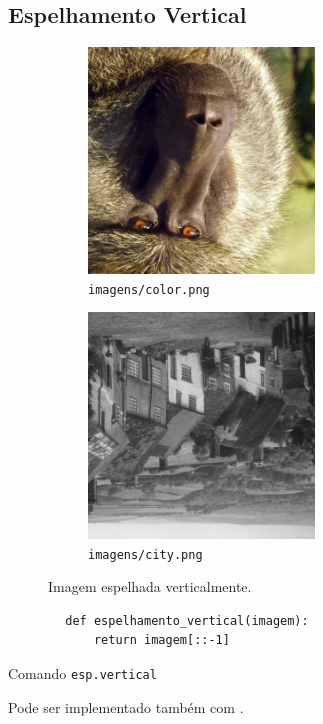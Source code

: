 \subsection{Espelhamento Vertical}

\begin{figure}[H]
    \centering
    \begin{subfigure}{0.45\textwidth}
        \centering
        \includegraphics[width=6cm]{resultados/colorflip.png}
        \caption{\texttt{imagens/color.png}}
    \end{subfigure}%
    \begin{subfigure}{0.45\textwidth}
        \centering
        \includegraphics[width=6cm]{resultados/cityflip.png}
        \caption{\texttt{imagens/city.png}}
    \end{subfigure}

    \caption{Imagem espelhada verticalmente.}
\end{figure}

\begin{listing}[H]
    \begin{verbatim}
        def espelhamento_vertical(imagem):
            return imagem[::-1]
    \end{verbatim}

    \caption{Comando \texttt{esp.vertical}}
\end{listing}

Pode ser implementado também com  \autocite{ref:flip}.
